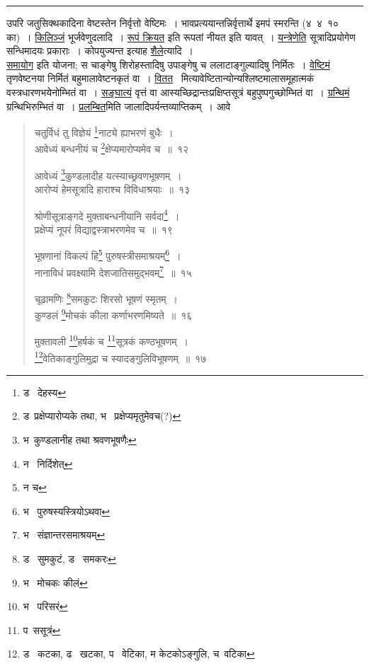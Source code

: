 \documentclass[11pt, openany]{book}
\begin{document}
\hrule

\vspace{2mm}
\noindent
उपरि जतुसिक्थकादिना वेष्टस्तेन निर्वृत्तो वेष्टिमः~। भावप्रत्ययान्तन्निर्वृत्तार्थे इमपं स्मरन्ति (४\textendash\ ४\textendash\ १० का)~। \underline{किलिञ्जं} भूर्जवेणुदलादि~। \underline{रूपं क्रियत} इति रूपतां नीयत इति यावत्~। \underline{यन्त्रेणेति} सूत्रादिप्रयोगेण सन्धिमादयः प्रकाराः~। कोपयुज्यन्त इत्याह \underline{शैले}त्यादि~।\\

\underline{समायोग} इति योजना; स चाङ्गेषु शिरोहस्तादिषु उपाङ्गेषु च ललाटाङ्गुल्यादिषु निर्मितः~। \underline{वेष्टिमं} तृणवेष्टनया निर्मितं बहुमालावेष्टनकृतं वा~। \underline{वितत} \textendash\ मित्यावेष्टितान्योन्यश्लिष्टमालासमूहात्मकं वस्त्रधारणभयेनोम्भितं वा~। \underline{सङ्घात्यं} वृत्तं वा आस्यच्छिद्रान्तःप्रक्षिप्तसूत्रं बहुपुष्पगुच्छोम्भितं वा~। \underline{ग्रन्थिमं} ग्रन्थिभिरुम्भितं वा~। \underline{प्रलम्बित}मिति जालादिपर्यन्तव्याप्तिकम्~। आवे\textendash

\newpage

\begin{quote}
{\na चतुर्विधं तु विज्ञेयं \renewcommand{\thefootnote}{1}\footnote{ड \textendash\ देहस्य}नाट्ये ह्याभरणं बुधैः~।\\
आवेध्यं बन्धनीयं च \renewcommand{\thefootnote}{2}\footnote{ड\textendash\ प्रक्षेप्यारोप्यके तथा, भ \textendash\ प्रक्षेप्यमृतुमेवच(?)}क्षेप्यमारोप्यमेव च~॥~१२

आवेध्यं \renewcommand{\thefootnote}{3}\footnote{भ\textendash\ कुण्डलानीह तथा श्रवणभूषणैः}कुण्डलादीह यत्स्याच्छ्रवणभूषणम्~।\\
आरोप्यं हेमसूत्रादि हाराश्च विविधाश्रयाः~॥~१३

श्रोणीसूत्राङ्गदे मुक्ताबन्धनीयानि सर्वदा\renewcommand{\thefootnote}{4}\footnote{न \textendash\ निर्दिशेत्}~।\\
प्रक्षेप्यं नूपरं विद्याद्वस्त्राभरणमेव च~॥~१९

भूषणानां विकल्पं हि\renewcommand{\thefootnote}{5}\footnote{न च} पुरुषस्त्रीसमाश्रयम्\renewcommand{\thefootnote}{6}\footnote{भ \textendash\ पुरुषस्यस्त्रियोऽथवा}~।\\
नानाविधं प्रवक्ष्यामि देशजातिसमुद्भवम्\renewcommand{\thefootnote}{7}\footnote{भ \textendash\ संज्ञान्तरसमाश्रयम्}~॥~१५

चूढामणिः \renewcommand{\thefootnote}{8}\footnote{ड \textendash\ सुमकुटं, ड \textendash\ समकरः}समकुटः शिरसो भूषणं स्मृतम्~।\\
कुण्डलं \renewcommand{\thefootnote}{9}\footnote{भ \textendash\ मोचकः कीलं}मोचकं कीला कर्णाभरणमिष्यते~॥~१६

मुक्तावली \renewcommand{\thefootnote}{10}\footnote{भ \textendash\ परिसरं}हर्षकं च \renewcommand{\thefootnote}{11}\footnote{प\textendash\ ससूत्रं}सूत्रकं कण्ठभूषणम्~।\\
\renewcommand{\thefootnote}{12}\footnote{ड \textendash\ कटका, ढ \textendash\ खटका, प \textendash\ वेटिका, म केटकोऽङ्गुलि, च\textendash\ वटिका}वेतिकाङ्गुलिमुद्रा च स्यादङ्गुलिविभूषणम्~॥~१७}
\end{quote}
\end{document}
